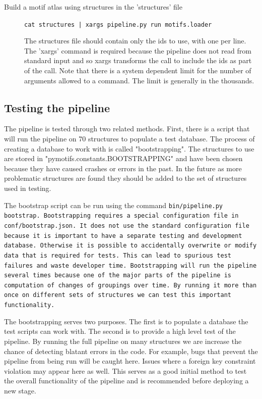 \begin{description}
        \item [Build a motif atlas using structures in the 'structures' file]
                \tt{cat structures | xargs pipeline.py run motifs.loader}

                The structures file should contain only the ids to use, with one
                per line. The 'xargs' command is required because the pipeline
                does not read from standard input and so xargs transforms the
                call to include the ids as part of the call. Note that there is
                a system dependent limit for the number of arguments allowed to
                a command. The limit is generally in the thousands.
\end{description}

\subsection{Testing the pipeline}

The pipeline is tested through two related methods. First, there is a script
that will run the pipeline on 70 structures to populate a test database. The
process of creating a database to work with is called "bootstrapping". The
structures to use are stored in "pymotifs.constants.BOOTSTRAPPING" and have been
chosen because they have caused crashes or errors in the past. In the future as
more problematic structures are found they should be added to the set of
structures used in testing.

The bootstrap script can be run using the command \tt{bin/pipeline.py bootstrap}.
Bootstrapping requires a special configuration file in conf/bootstrap.json. It
does not use the standard configuration file because it is important to have a
separate testing and development database. Otherwise it is possible to
accidentally overwrite or modify data that is required for tests. This can lead
to spurious test failures and waste developer time. Bootstrapping will run the
pipeline several times because one of the major parts of the pipeline is
computation of changes of groupings over time. By running it more than once on
different sets of structures we can test this important functionality.

The bootstrapping serves two purposes. The first is to populate a database the
test scripts can work with. The second is to provide a high level test of the
pipeline. By running the full pipeline on many structures we are increase the
chance of detecting blatant errors in the code. For example, bugs that prevent
the pipeline from being run will be caught here. Issues where a foreign key
constraint violation may appear here as well. This serves as a good initial
method to test the overall functionality of the pipeline and is recommended
before deploying a new stage.

